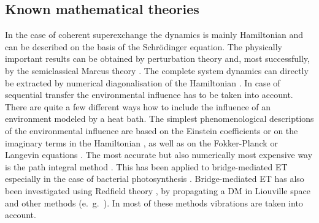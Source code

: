 \documentclass[12pt,twoside,a4paper]{report}
\begin{document}
\subsection{Known mathematical theories\label{mat-theor}} 
 
In the case of coherent superexchange the dynamics is mainly Hamiltonian and 
can be described on the basis of the Schr\"{o}dinger equation. The 
physically important results can be obtained by perturbation theory \cite 
{m6,c3} and, most successfully, by the semiclassical Marcus theory \cite 
{marc56}. The complete system dynamics can  directly be extracted by 
numerical diagonalisation of the Hamiltonian \cite{m10,j22}. In case of 
sequential transfer the environmental influence has to be taken into 
account. There are quite a few different ways how to include the influence 
of an environment modeled by a heat bath. The simplest phenomenological 
descriptions of the environmental influence are based on the Einstein 
coefficients or on the imaginary terms in the Hamiltonian \cite{weis99,l4}, 
as well as on the Fokker-Planck or Langevin equations \cite{weis99,l4}. The 
most accurate but also numerically most expensive way is the path integral 
method \cite{weis99}. This has been applied to bridge-mediated ET especially 
in the case of bacterial photosynthesis \cite{pim}. Bridge-mediated ET has 
also been investigated using Redfield theory \cite{schr98b,p3}, by 
propagating a DM in Liouville space \cite{skou95} and other 
methods (e.~g.\ \cite{e1,j22,guo94}). In  most of these methods 
vibrations are taken into account. 
 
\end{document}

